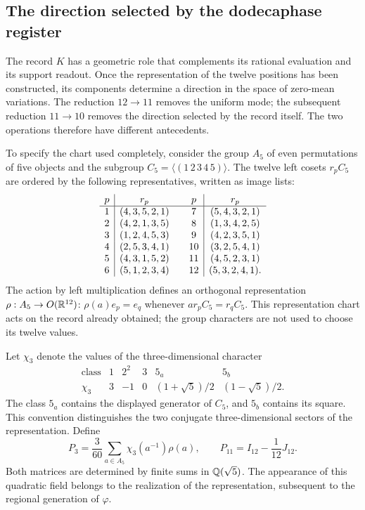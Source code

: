 \subsection{The direction selected by the dodecaphase register}
\label{exc:k-direccion}

The record \(K\) has a geometric role that complements its rational
evaluation and its support readout. Once the representation of the twelve
positions has been constructed, its components determine a direction in the
space of zero-mean variations. The reduction \(12\to11\) removes the
uniform mode; the subsequent reduction \(11\to10\) removes the direction
selected by the record itself. The two operations therefore have different
antecedents.

To specify the chart used completely, consider the group \(A_5\) of even
permutations of five objects and the subgroup
\(C_5=\langle(1\,2\,3\,4\,5)\rangle\). The twelve left cosets
\(r_pC_5\) are ordered by the following representatives, written as image
lists:
\[
\begin{array}{c|c@{\qquad}c|c}
p&r_p&p&r_p\\ \hline
1&(4,3,5,2,1)&7&(5,4,3,2,1)\\
2&(4,2,1,3,5)&8&(1,3,4,2,5)\\
3&(1,2,4,5,3)&9&(4,2,3,5,1)\\
4&(2,5,3,4,1)&10&(3,2,5,4,1)\\
5&(4,3,1,5,2)&11&(4,5,2,3,1)\\
6&(5,1,2,3,4)&12&(5,3,2,4,1).
\end{array}
\]
The action by left multiplication defines an orthogonal representation
\(\rho:A_5\to O(\mathbb R^{12})\): \(\rho(a)e_p=e_q\) whenever
\(ar_pC_5=r_qC_5\). This representation chart acts on the record already
obtained; the group characters are not used to choose its twelve values.

Let \(\chi_3\) denote the values of the three-dimensional character
\[
\begin{array}{c|ccccc}
\text{class}&1&2^2&3&5_a&5_b\\ \hline
\chi_3&3&-1&0&(1+\sqrt5)/2&(1-\sqrt5)/2.
\end{array}
\]
The class \(5_a\) contains the displayed generator of \(C_5\), and
\(5_b\) contains its square. This convention distinguishes the two conjugate
three-dimensional sectors of the representation. Define
\begin{equation}
 P_3=\frac3{60}\sum_{a\in A_5}\chi_3(a^{-1})\rho(a),
 \qquad P_{11}=I_{12}-\frac1{12}J_{12}.
 \label{eq:k-proyectores-incidencia}
\end{equation}
Both matrices are determined by finite sums in \(\mathbb Q(\sqrt5)\). The
appearance of this quadratic field belongs to the realization of the
representation, subsequent to the regional generation of \(\varphi\).

